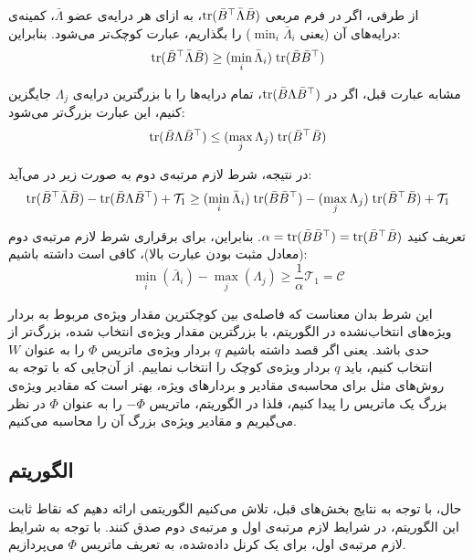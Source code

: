 از طرفی، اگر در فرم مربعی
$ \mathrm{tr} ( \bar{B}^\top  \bar{\Lambda} \bar{B})$،
به ازای هر درایه‌ی عضو
$\bar{\Lambda}$، 
کمینه‌ی درایه‌های آن (یعنی 
$\min_i \bar{\Lambda}_i$)
را بگذاریم، عبارت کوچک‌تر می‌شود. بنابراین:
\[ \mathrm{tr} ( \bar{B}^\top  \bar{\Lambda} \bar{B}) \geq 
(\min_i \bar{\Lambda}_i)\; \mathrm{tr} ( \bar{B} \bar{B}^\top ) \]

مشابه عبارت قبل، اگر در 
$\mathrm{tr} ( \bar{B} \Lambda \bar{B}^\top )$،
تمام درایه‌ها را با بزرگترین درایه‌ی 
$\Lambda_j$ 
جایگزین کنیم، این عبارت بزرگ‌تر می‌شود:
\[ \mathrm{tr} ( \bar{B} \Lambda \bar{B}^\top ) \leq 
(\max_j \Lambda_j) \; \mathrm{tr} ( \bar{B}^\top  \bar{B}) \]

در نتیجه،  شرط لازم مرتبه‌ی دوم به صورت زیر در می‌آید:
\small
\begin{equation}
 \mathrm{tr} ( 
\bar{B}^\top  \bar{\Lambda} \bar{B}) - \mathrm{tr} ( \bar{B} \Lambda \bar{B}^\top )
+\mathcal{T}_1 \geq (\min_i \bar{\Lambda}_i)\; \mathrm{tr} ( \bar{B} \bar{B}^\top ) - (\max_j \Lambda_j) \; \mathrm{tr} ( \bar{B}^\top  \bar{B}) + \mathcal{T}_1
\end{equation}
\normalsize

تعریف کنید
$\alpha = \mathrm{tr}(\bar{B}\bar{B}^\top) = \mathrm{tr}(\bar{B}^\top\bar{B})$.
بنابراین، برای برقراری شرط لازم مرتبه‌ی دوم (معادل مثبت بودن عبارت‌ بالا)، کافی است داشته باشیم:
\begin{equation}
\min_i(\bar{\Lambda}_i) - 
\max_j(\Lambda_j)  \geq \frac{1}{\alpha} \mathcal{T}_1 = \mathcal{C}
\label{final}
\end{equation}

این شرط بدان معناست که فاصله‌ی بین کوچکترین مقدار ویژه‌ی مربوط به بردار ویژه‌های انتخاب‌نشده در الگوریتم، با بزرگترین مقدار ویژه‌ی انتخاب شده، بزرگ‌تر از حدی باشد. یعنی اگر قصد داشته ‌باشیم
$q$
بردار ویژه‌ی ماتریس 
$\Phi$
را به عنوان 
$W$
 انتخاب کنیم، باید 
$q$
بردار ویژه‌ی کوچک را انتخاب نماییم. از آن‌جایی که با توجه به روش‌های مثل
برای محاسبه‌ی مقادیر و بردار‌های ویژه، بهتر است که مقادیر ویژه‌ی بزرگ یک ماتریس را پیدا کنیم، فلذا در الگوریتم، ماتریس 
$-\Phi$
را به عنوان 
$\Phi$
در نظر می‌گیریم و مقادیر ویژه‌ی بزرگ آن را محاسبه می‌کنیم. 

\subsection{الگوریتم 
}

حال، با توجه به نتایج بخش‌های قبل، تلاش می‌کنیم الگوریتمی ارائه دهیم که نقاط ثابت این الگوریتم، در شرایط لازم مرتبه‌ی اول و مرتبه‌ی دوم صدق کنند. با توجه به شرایط لازم مرتبه‌ی اول، برای یک کرنل
داده‌شده، به تعریف ماتریس 
$\Phi$
می‌پردازیم.

